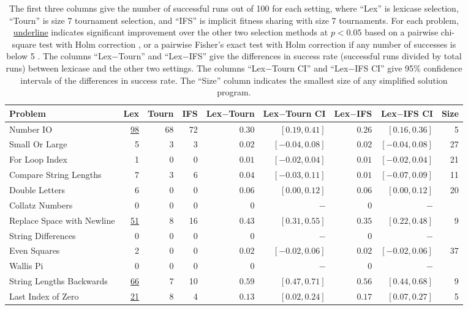 \documentclass{sig-alternate}
\begin{document}
\begin{table*}[t]
\centering
\caption{The first three columns give the number of successful runs out of 100 for each setting, where ``Lex'' is lexicase selection, ``Tourn'' is size 7 tournament selection, and ``IFS'' is implicit fitness sharing with size 7 tournaments. For each problem, \underline{underline} indicates significant improvement over the other two selection methods at $p < 0.05$ based on a pairwise chi-square test with Holm correction \cite{R}, or a pairwise Fisher's exact test with Holm correction if any number of successes is below 5 \cite{fmsb}. The columns ``Lex$-$Tourn'' and ``Lex$-$IFS'' give the differences in success rate (successful runs divided by total runs) between lexicase and the other two settings. The columns ``Lex$-$Tourn CI'' and ``Lex$-$IFS CI'' give 95\% confidence intervals of the differences in success rate. The ``Size'' column indicates the smallest size of any simplified solution program.}
\label{tableResults}
\begin{tabular}{lrrr|rrrr|r}
\toprule
Problem & Lex & Tourn & IFS & Lex$-$Tourn & Lex$-$Tourn CI & Lex$-$IFS & Lex$-$IFS CI & Size \tabularnewline
\midrule
Number IO  & \underline{98}                 & 68      & 72  & $0.30$ & $[0.19, 0.41]$ & $0.26$ & $[0.16, 0.36]$ & 5 \tabularnewline
Small Or Large  & 5            & 3       & 3           & $0.02$ & $[-0.04, 0.08]$ & $0.02$ & $[-0.04, 0.08]$ & 27 \tabularnewline
For Loop Index  & 1            & 0       & 0        & $0.01$ & $[-0.02, 0.04]$ & $0.01$ & $[-0.02, 0.04]$ & 21 \tabularnewline
Compare String Lengths  & 7     & 3       & 6       & $0.04$ & $[-0.03, 0.11]$ & $0.01$ & $[-0.07, 0.09]$ & 11 \tabularnewline
Double Letters   & 6           & 0       & 0    & $0.06$ & $[0.00, 0.12]$ & $0.06$ & $[0.00, 0.12]$ & 20 \tabularnewline
Collatz Numbers    & 0          & 0       & 0         &   $0$ & $-$ & $0$ & $-$ &  \tabularnewline
Replace Space with Newline & \underline{51} & 8       & 16        & $0.43$ & $[0.31, 0.55]$ & $0.35$ & $[0.22, 0.48]$ & 9 \tabularnewline
String Differences         & 0       & 0   & 0        & $0$ & $-$ & $0$ & $-$ &  \tabularnewline
Even Squares  & 2              & 0       & 0          & $0.02$ & $[-0.02, 0.06]$ & $0.02$ & $[-0.02, 0.06]$ & 37 \tabularnewline
Wallis Pi                  & 0       & 0   & 0        &   $0$ & $-$ & $0$ & $-$ &  \tabularnewline
String Lengths Backwards & \underline{66}   & 7       & 10        & $0.59$ & $[0.47, 0.71]$ & $0.56$ & $[0.44, 0.68]$ & 9 \tabularnewline
Last Index of Zero  & \underline{21}         & 8       & 4        & $0.13$ & $[0.02, 0.24]$ & $0.17$ & $[0.07, 0.27]$ & 5 \tabularnewline

\end{tabular}
\end{table*}
\end{document}
